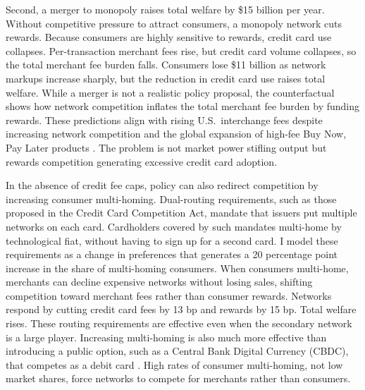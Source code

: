 \documentclass[main.tex]{subfiles}
\begin{document}
Second, a merger to monopoly raises total welfare by \$15 billion per year.
Without competitive pressure to attract consumers, a monopoly network cuts rewards.
Because consumers are highly sensitive to rewards, credit card use collapses.
Per-transaction merchant fees rise, but credit card volume collapses, so the total merchant fee burden falls.
Consumers lose \$11 billion as network markups increase sharply, but the reduction in credit card use raises total welfare.
While a merger is not a realistic policy proposal, the counterfactual shows how network competition inflates the total merchant fee burden by funding rewards.
These predictions align with rising U.S.\ interchange fees despite increasing network competition \parencite{GAO2009} and the global expansion of high-fee Buy Now, Pay Later products \parencite{Berg.etal2024}.
The problem is not market power stifling output but rewards competition generating excessive credit card adoption.

In the absence of credit fee caps, policy can also redirect competition by increasing consumer multi-homing.
Dual-routing requirements, such as those proposed in the Credit Card Competition Act, mandate that issuers put multiple networks on each card.
Cardholders covered by such mandates multi-home by technological fiat, without having to sign up for a second card.
I model these requirements as a change in preferences that generates a 20 percentage point increase in the share of multi-homing consumers.
When consumers multi-home, merchants can decline expensive networks without losing sales, shifting competition toward merchant fees rather than consumer rewards.
Networks respond by cutting credit card fees by 13 bp and rewards by 15 bp.
Total welfare rises.
These routing requirements are effective even when the secondary network is a large player.
Increasing multi-homing is also much more effective than introducing a public option, such as a Central Bank Digital Currency (CBDC), that competes as a debit card \parencite{Berg.etal2024a}.
High rates of consumer multi-homing, not low market shares, force networks to compete for merchants rather than consumers.
\end{document}
